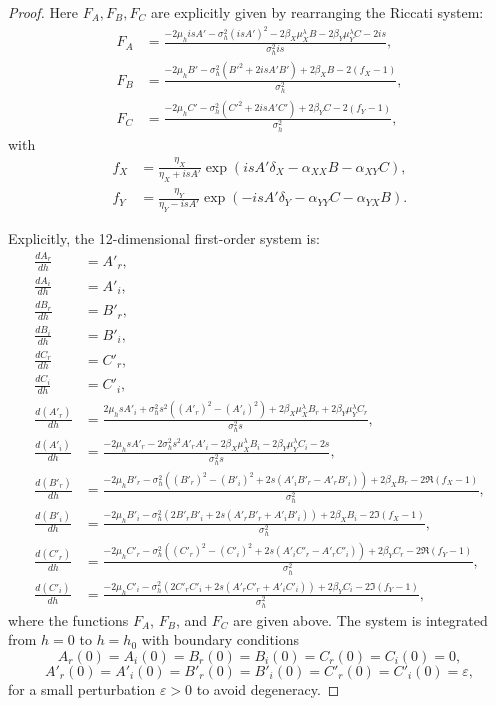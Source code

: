 \documentclass{article}
\theoremstyle{definition}
\begin{document}
\begin{proof}
Here $F_A, F_B, F_C$ are explicitly given by rearranging the Riccati system:
\[
\begin{aligned}
F_A &= \frac{ -2\mu_h i s A' - \sigma_h^2 (i s A')^2 - 2\beta_X \mu_X^\lambda B - 2\beta_Y \mu_Y^\lambda C - 2 i s}{\sigma_h^2 i s}, \\[1ex]
F_B &= \frac{-2\mu_h B' - \sigma_h^2(B'^2 + 2 i s A' B') + 2 \beta_X B - 2(f_X - 1)}{\sigma_h^2}, \\[1ex]
F_C &= \frac{-2\mu_h C' - \sigma_h^2(C'^2 + 2 i s A' C') + 2 \beta_Y C - 2(f_Y - 1)}{\sigma_h^2},
\end{aligned}
\]
with
\[
\begin{aligned}
f_X &= \frac{\eta_X}{\eta_X + i s A'} 
\exp\!\left( i s A' \delta_X - \alpha_{XX} B - \alpha_{XY} C \right), \\
f_Y &= \frac{\eta_Y}{\eta_Y - i s A'} 
\exp\!\left( -i s A' \delta_Y - \alpha_{YY} C - \alpha_{YX} B \right).
\end{aligned}
\]

Explicitly, the 12-dimensional first-order system is:
\begin{align}
\frac{dA_r}{dh} &= A'_r, \\
\frac{dA_i}{dh} &= A'_i, \\
\frac{dB_r}{dh} &= B'_r, \\
\frac{dB_i}{dh} &= B'_i, \\
\frac{dC_r}{dh} &= C'_r, \\
\frac{dC_i}{dh} &= C'_i, \\
\frac{d(A'_r)}{dh} &= \frac{2\mu_h s A'_i + \sigma_h^2 s^2 ((A'_r)^2 - (A'_i)^2) + 2\beta_X \mu_X^\lambda B_r + 2\beta_Y \mu_Y^\lambda C_r}{\sigma_h^2 s}, \\
\frac{d(A'_i)}{dh} &= \frac{-2\mu_h s A'_r - 2\sigma_h^2 s^2 A'_r A'_i - 2\beta_X \mu_X^\lambda B_i - 2\beta_Y \mu_Y^\lambda C_i - 2s}{\sigma_h^2 s}, \\
\frac{d(B'_r)}{dh} &= \frac{-2\mu_h B'_r - \sigma_h^2((B'_r)^2 - (B'_i)^2 + 2s(A'_i B'_r - A'_r B'_i)) + 2\beta_X B_r - 2\Re(f_X - 1)}{\sigma_h^2}, \\
\frac{d(B'_i)}{dh} &= \frac{-2\mu_h B'_i - \sigma_h^2(2B'_r B'_i + 2s(A'_r B'_r + A'_i B'_i)) + 2\beta_X B_i - 2\Im(f_X - 1)}{\sigma_h^2}, \\
\frac{d(C'_r)}{dh} &= \frac{-2\mu_h C'_r - \sigma_h^2((C'_r)^2 - (C'_i)^2 + 2s(A'_i C'_r - A'_r C'_i)) + 2\beta_Y C_r - 2\Re(f_Y - 1)}{\sigma_h^2}, \\
\frac{d(C'_i)}{dh} &= \frac{-2\mu_h C'_i - \sigma_h^2(2C'_r C'_i + 2s(A'_r C'_r + A'_i C'_i)) + 2\beta_Y C_i - 2\Im(f_Y - 1)}{\sigma_h^2},
\end{align}
where the functions $F_A$, $F_B$, and $F_C$ are given above. The system is integrated from $h = 0$ to $h = h_0$ with boundary conditions
\[
A_r(0)=A_i(0)=B_r(0)=B_i(0)=C_r(0)=C_i(0)=0, 
\]
\[
A'_r(0)=A'_i(0)=B'_r(0)=B'_i(0)=C'_r(0)=C'_i(0)=\varepsilon,
\]
for a small perturbation $\varepsilon > 0$ to avoid degeneracy.
\end{proof}
\end{document}

